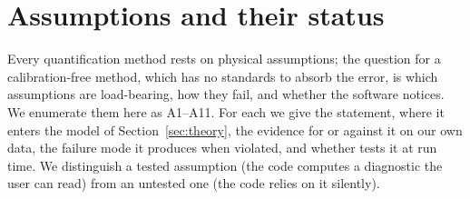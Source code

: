 \section{Assumptions and their status}
\label{sec:assumptions}

Every quantification method rests on physical assumptions; the question for a
calibration-free method, which has no standards to absorb the error, is which
assumptions are load-bearing, how they fail, and whether the software notices. We
enumerate them here as A1--A11. For each we give the statement, where it enters the
model of Section~\ref{sec:theory}, the evidence for or against it on our own data, the
failure mode it produces when violated, and whether \alibz{} tests it at run time. We
distinguish a tested assumption (the code computes a diagnostic the user can read)
from an untested one (the code relies on it silently).

